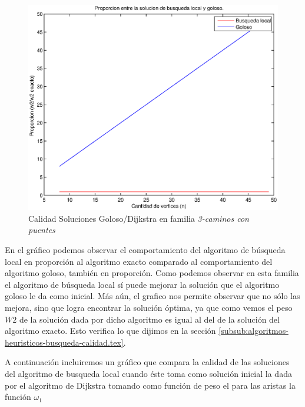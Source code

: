 \begin{figure}[H]
  \begin{center}
    \begin{minipage}{0.5\linewidth}
      \includegraphics[width=\linewidth]{graficos/busq_local_proporcion2.eps}
      \caption{Calidad Soluciones Goloso/Dijkstra en familia \emph{3-caminos con puentes}}\label{fig:busq-local-proporcion-2}
    \end{minipage}
  \end{center}
\end{figure}

En el gráfico podemos observar el comportamiento del algoritmo de búsqueda local en proporción al algoritmo exacto comparado al comportamiento del algoritmo goloso, también en proporción. Como podemos observar en esta familia el algoritmo de búsqueda local sí puede mejorar la solución que el algoritmo goloso le da como inicial. Más aún, el grafico nos permite observar que no sólo las mejora, sino que logra encontrar la solución óptima, ya que como vemos el peso $W2$ de la solución dada por dicho algoritmo es igual al del de la solución del algoritmo exacto. Esto verifica lo que dijimos en la sección \ref{subsub:algoritmos-heuristicos-busqueda-calidad.tex}.

A continuación incluiremos un gráfico que compara la calidad de las soluciones del algoritmo de busqueda local cuando éste toma como solución inicial la dada por el algoritmo de Dijkstra tomando como función de peso el para las aristas la función $\omega_1$

